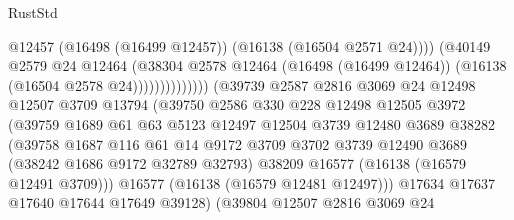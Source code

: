 \begin{lexlean}{RustStd}
\begin{coremodule}
                                              @12457
                                              (@16498 (@16499 @12457))
                                              (@16138 (@16504 @2571 @24))))
                                          (@40149
                                            @2579
                                            @24
                                            @12464
                                            (@38304
                                              @2578
                                              @12464
                                              (@16498 (@16499 @12464))
                                              (@16138 (@16504 @2578 @24))))))))))))))
                      (@39739
                        @2587
                        @2816
                        @3069
                        @24
                        @12498
                        @12507
                        @3709
                        @13794
                        (@39750
                          @2586
                          @330
                          @228
                          @12498
                          @12505
                          @3972
                          (@39759
                            @1689
                            @61
                            @63
                            @5123
                            @12497
                            @12504
                            @3739
                            @12480
                            @3689
                            @38282
                            (@39758
                              @1687
                              @116
                              @61
                              @14
                              @9172
                              @3709
                              @3702
                              @3739
                              @12490
                              @3689
                              (@38242 @1686 @9172 @32789 @32793)
                              @38209
                              @16577
                              (@16138 (@16579 @12491 @3709)))
                            @16577
                            (@16138 (@16579 @12481 @12497)))
                          @17634
                          @17637
                          @17640
                          @17644
                          @17649
                          @39128)
                        (@39804
                          @12507
                          @2816
                          @3069
                          @24

\end{coremodule}
\end{lexlean}
